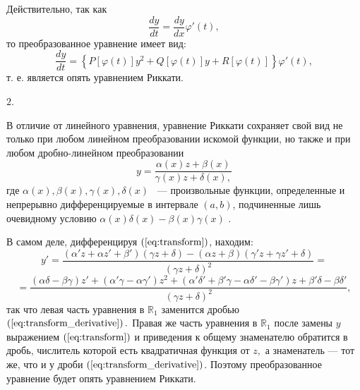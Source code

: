 Действительно, так как
\begin{equation}  \label{eq:param_derivative}
    \dfrac{dy}{dt} = \dfrac{dy}{dx} \varphi'\left( t \right),
\end{equation}
то преобразованное уравнение имеет вид:
$$\dfrac{dy}{dt} = \left\{ P \left[\varphi\left( t \right) \right] y^{2} + Q \left[\varphi\left( t \right) \right] y + R\left[\varphi\left( t \right) \right] \right\} \varphi' \left( t \right),$$
т. е. является опять уравнением Риккати.

\hypertarget{sec_prop}{$2.$} В отличие от линейного уравнения, уравнение Риккати сохраняет свой вид не только при любом линейном преобразовании искомой функции, но также и при любом дробно-линейном преобразовании
\begin{equation}  \label{eq:transform}
    y = \dfrac{\alpha \left( x \right) z + \beta \left( x \right)}{\gamma \left( x \right) z + \delta \left( x \right),}
\end{equation}
где $\alpha \left( x \right), \beta \left( x \right), \gamma \left( x \right), \delta \left( x \right)$ ~--- произвольные функции, определенные и непрерывно дифференцируемые в интервале $\left( a, b \right)$, подчиненные лишь очевидному условию $\alpha \left( x \right) \delta \left( x \right) - \beta \left( x \right) \gamma \left( x \right)$ \cite{matveev}.

В самом деле, дифференцируя $\left( \ref{eq:transform} \right)$, находим:
$$ 
    y' = \dfrac{\left( \alpha'z + \alpha z' + \beta' \right) \left( \gamma z + \delta \right) - \left( \alpha z + \beta \right) \left( \gamma' z + \gamma z' + \delta \right)}{\left( \gamma z + \delta \right)^2} =
$$
\begin{equation}  \label{eq:transform_derivative}
    = \dfrac{\left( \alpha \delta - \beta \gamma \right)z' + \left( \alpha' \gamma - \alpha \gamma' \right)z^{2} + \left( \alpha' \delta' + \beta' \gamma - \alpha \delta' - \beta \gamma' \right)z + \beta' \delta - \beta \delta'}{\left( \gamma z + \delta \right)^2},
\end{equation}
так что левая часть уравнения в $\mathbb{R}_1$ заменится дробью $ \left( \ref{eq:transform_derivative} \right).$ Правая же часть уравнения в $\mathbb{R}_1$ после замены $y$ выражением $\left( \ref{eq:transform} \right)$ и приведения к общему знаменателю обратится в дробь, числитель которой есть квадратичная функция от $z,$ а знаменатель --- тот же, что и у дроби $\left( \ref{eq:transform_derivative} \right)$. Поэтому преобразованное уравнение будет опять уравнением Риккати.

